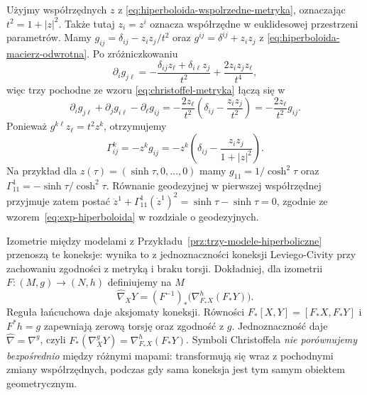 \begin{przyklad}
\label{prz:christoffel-hiperboloida}
Użyjmy współrzędnych $z$ z
\eqref{eq:hiperboloida-wspolrzedne-metryka},
oznaczając $t^2=1+|z|^2$. Także tutaj $z_i=z^i$
oznacza współrzędne w euklidesowej przestrzeni parametrów. Mamy
$g_{ij}=\delta_{ij}-z_i z_j/t^2$
oraz $g^{ij}=\delta^{ij}+z_i z_j$ z
\eqref{eq:hiperboloida-macierz-odwrotna}.
Po zróżniczkowaniu
\[
 \partial_i g_{j\ell}
 =-\frac{\delta_{ij}z_\ell+\delta_{i\ell}z_j}{t^2}
   +\frac{2z_i z_j z_\ell}{t^4},
\]
więc trzy pochodne ze wzoru
\eqref{eq:christoffel-metryka} łączą się w
\[
 \partial_i g_{j\ell}+\partial_j g_{i\ell}
                -\partial_\ell g_{ij}
 =-\frac{2z_\ell}{t^2}
            \left(\delta_{ij}-\frac{z_i z_j}{t^2}\right)
 =-\frac{2z_\ell}{t^2}g_{ij}.
\]
Ponieważ $g^{k\ell}z_\ell=t^2 z^k$, otrzymujemy
\begin{equation}\label{eq:gamma-hiperboloida}
 \boxed{\displaystyle\Gamma^k_{ij}=-z^k g_{ij}
  =-z^k\left(\delta_{ij}-\frac{z_i z_j}{1+|z|^2}\right).}
\end{equation}
Na przykład dla $z(\tau)=(\sinh\tau,0,\ldots,0)$
mamy $g_{11}=1/\cosh^2\tau$ oraz
$\Gamma^1_{11}=-\sinh\tau/\cosh^2\tau$.
Równanie geodezyjnej w pierwszej współrzędnej
przyjmuje zatem postać
$\ddot z^1+\Gamma^1_{11}(\dot z^1)^2
=\sinh\tau-\sinh\tau=0$,
zgodnie ze wzorem~\eqref{eq:exp-hiperboloida}
w rozdziale o geodezyjnych.
\end{przyklad}

Izometrie między modelami z
Przykładu~\ref{prz:trzy-modele-hiperboliczne}
przenoszą te koneksje: wynika to z jednoznaczności
koneksji Leviego-Civity przy zachowaniu zgodności
z metryką i braku torsji. Dokładniej, dla izometrii
$F:(M,g)\to(N,h)$ definiujemy na $M$
\[
 \widehat\nabla_XY=(F^{-1})_*
       \bigl(\nabla^h_{F_*X}(F_*Y)\bigr).
\]
Reguła łańcuchowa daje aksjomaty koneksji. Równości
$F_*[X,Y]=[F_*X,F_*Y]$ i $F^*h=g$ zapewniają zerową
torsję oraz zgodność z $g$. Jednoznaczność daje
$\widehat\nabla=\nabla^g$, czyli
$F_*(\nabla^g_XY)=\nabla^h_{F_*X}(F_*Y)$.
Symboli Christoffela
\emph{nie porównujemy bezpośrednio} między różnymi
mapami: transformują się wraz z pochodnymi zmiany
współrzędnych, podczas gdy sama koneksja jest
tym samym obiektem geometrycznym.

